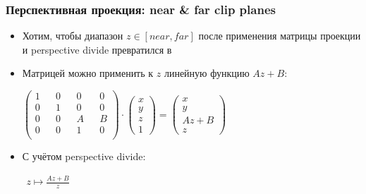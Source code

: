 \documentclass{beamer}
\begin{document}
\begin{frame}[fragile]
\frametitle{Перспективная проекция: near \& far clip planes}
\begin{itemize}
\item Хотим, чтобы диапазон \begin{math}z\in [near,far]\end{math} после применения матрицы проекции и perspective divide превратился в \begin{math}[-1,1]\end{math}
\pause
\item Матрицей можно применить к \begin{math}z\end{math} линейную функцию \begin{math}Az+B\end{math}:
\begin{center}
\begin{math}
\begin{pmatrix}
1 && 0 && 0 && 0 \\
0 && 1 && 0 && 0 \\
0 && 0 && A && B \\
0 && 0 && 1 && 0 \\
\end{pmatrix}
\cdot
\begin{pmatrix}
x \\ y \\ z \\ 1
\end{pmatrix}
=
\begin{pmatrix}
x \\ y \\ Az+B \\ z
\end{pmatrix}
\end{math}
\end{center}
\pause
\item С учётом perspective divide:
\begin{center}
\begin{math}
\begin{matrix}
z \mapsto \frac{Az + B}{z}
\end{matrix}
\end{math}
\end{center}
\end{itemize}
\end{frame}
\end{document}

